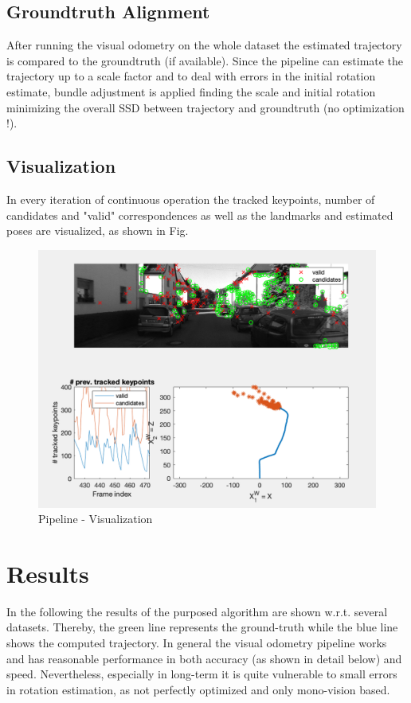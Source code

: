 \documentclass[letterpaper, 12 pt]{article}
\begin{document}
\begin{multicols*}{2}
\subsection{Groundtruth Alignment}
After running the visual odometry on the whole dataset the estimated trajectory is compared to the groundtruth (if available). Since the pipeline can estimate the trajectory up to a scale factor and to deal with errors in the initial rotation estimate, bundle adjustment is applied finding the scale and initial rotation minimizing the overall SSD between trajectory and groundtruth (no optimization !). 

\subsection{Visualization}
In every iteration of continuous operation the tracked keypoints, number of candidates and "valid" correspondences as well as the landmarks and estimated poses are visualized, as shown in Fig. 

\begin{figure}[H]
\begin{center}
\includegraphics[width=\linewidth]{visualisation.png}
\end{center}
\caption{Pipeline - Visualization}
\label{fig:visualisation}
\end{figure}

\section{Results}
In the following the results of the purposed algorithm are shown w.r.t. several datasets. Thereby, the green line represents the ground-truth while the blue line shows the computed trajectory. In general the visual odometry pipeline works and has reasonable performance in both accuracy (as shown in detail below) and speed. Nevertheless, especially in long-term it is quite vulnerable to small errors in rotation estimation, as not perfectly optimized and only mono-vision based. 


\end{multicols*}
\end{document}
